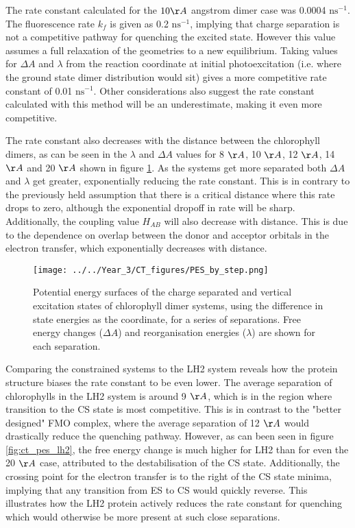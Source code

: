 The rate constant calculated for the $10\AA{}$ angstrom dimer case was 0.0004 $\text{ns}^{-1}$.
The fluorescence rate $k_f$ is given as 0.2 $\text{ns}^{-1}$, implying that charge
separation is not a competitive pathway for quenching the excited state. However
this value assumes a full relaxation of the geometries to a new equilibrium. Taking
values for $\Delta A$ and $\lambda$ from the reaction coordinate at initial photoexcitation 
(i.e. where the ground state dimer distribution would sit) gives a more competitive 
rate constant of 0.01 $\text{ns}^{-1}$. Other considerations also suggest the rate
constant calculated with this method will be an underestimate, making it even more competitive.

The rate constant also decreases with the distance between the chlorophyll dimers, as can
be seen in the $\lambda$ and $\Delta A$ values for 8 $\AA{}$, 10 $\AA{}$, 12 $\AA{}$,
14 $\AA{}$ and 20 $\AA{}$ shown in figure \ref{fig:ct_pes_distance}. As the systems
get more separated both $\Delta A$ and $\lambda$ get greater, exponentially reducing 
the rate constant. This is in contrary to the previously held assumption that there 
is a critical distance where this rate drops to zero, although the exponential dropoff 
in rate will be sharp. Additionally, the coupling value $H_{AB}$ will also decrease 
with distance. This is due to the dependence on overlap between the donor and acceptor 
orbitals in the electron transfer, which exponentially decreases with distance.

\begin{figure}
    \centering
    \texttt{[image: ../../Year\_3/CT\_figures/PES\_by\_step.png]}
    \label{fig:ct_pes_distance}
    \caption{Potential energy surfaces of the charge separated and vertical excitation
    states of chlorophyll dimer systems, using the difference in state energies 
    as the coordinate, for a series of separations. Free energy changes ($\Delta A$)
    and reorganisation energies ($\lambda$) are shown for each separation.}
\end{figure}

Comparing the constrained systems to the LH2 system reveals how the protein structure
biases the rate constant to be even lower. The average separation of chlorophylls
in the LH2 system is around 9 $\AA{}$, which is in the region where transition to
the CS state is most competitive. This is in contrast to the "better designed" FMO
complex, where the average separation of 12 $\AA{}$ would drastically reduce the
quenching pathway. However, as can been seen in figure \ref{fig:ct_pes_lh2}, the
free energy change is much higher for LH2 than for even the 20 $\AA{}$ case, attributed
to the destabilisation of the CS state. Additionally, the crossing point for the
electron transfer is to the right of the CS state minima, implying that any transition
from ES to CS would quickly reverse. This illustrates how the LH2 protein actively 
reduces the rate constant for quenching which would otherwise be more present at 
such close separations.

